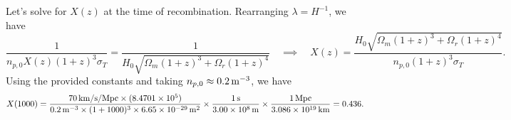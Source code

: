 \documentclass{lkx_pset}
\begin{document}
\begin{parts}
	Let's solve for $X(z)$ at the time of recombination. Rearranging $\lambda=H^{-1}$, we have
	\[
		\frac{1}{n_{p,0} X(z)(1+z)^3\sigma_T} = \frac{1}{H_0\sqrt{\Omega_m(1+z)^3 + \Omega_r(1+z)^4}}\quad\implies\quad
		X(z) = \frac{H_0\sqrt{\Omega_m(1+z)^3+\Omega_r(1+z)^4}}{n_{p,0}(1+z)^3\sigma_T}.
	\]
	Using the provided constants and taking $n_{p,0}\approx \nrhosi{0.2}$, we have
	\[
		X(1000) = \frac{\Hsi{70}\times (8.4701\times 10^5)}{\nrhosi{0.2}\times (1+1000)^3\times \mmsi{6.65e-29}}\times \frac{\ssi{1}}{\msi{3.00e8}}\times \frac{\Mpcsi{1}}{\kmsi{3.086e19}} = 0.436.
	\]
\end{parts}
\end{document}
